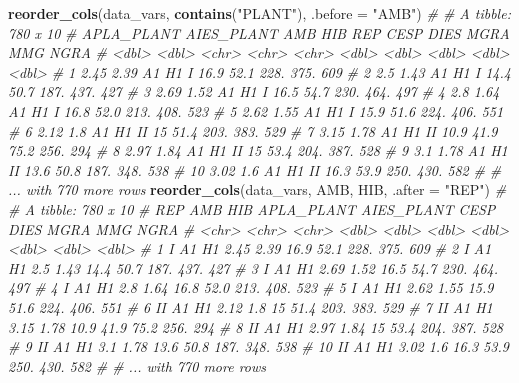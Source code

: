 \documentclass[
]{book}
\newenvironment{Shaded}{\begin{snugshade}}{\end{snugshade}}
\newcommand{\CommentTok}[1]{\textcolor[rgb]{0.56,0.35,0.01}{\textit{#1}}}
\newcommand{\DataTypeTok}[1]{\textcolor[rgb]{0.13,0.29,0.53}{#1}}
\newcommand{\KeywordTok}[1]{\textcolor[rgb]{0.13,0.29,0.53}{\textbf{#1}}}
\newcommand{\NormalTok}[1]{#1}
\newcommand{\StringTok}[1]{\textcolor[rgb]{0.31,0.60,0.02}{#1}}
\numberwithin{equation}{section}
\begin{document}
\begin{Shaded}
\begin{Highlighting}[]
\KeywordTok{reorder\_cols}\NormalTok{(data\_vars, }\KeywordTok{contains}\NormalTok{(}\StringTok{"PLANT"}\NormalTok{), }\DataTypeTok{.before =} \StringTok{"AMB"}\NormalTok{)}
\CommentTok{\# \# A tibble: 780 x 10}
\CommentTok{\#    APLA\_PLANT AIES\_PLANT AMB   HIB   REP    CESP  DIES  MGRA   MMG  NGRA}
\CommentTok{\#         \textless{}dbl\textgreater{}      \textless{}dbl\textgreater{} \textless{}chr\textgreater{} \textless{}chr\textgreater{} \textless{}chr\textgreater{} \textless{}dbl\textgreater{} \textless{}dbl\textgreater{} \textless{}dbl\textgreater{} \textless{}dbl\textgreater{} \textless{}dbl\textgreater{}}
\CommentTok{\#  1       2.45       2.39 A1    H1    I      16.9  52.1 228.   375.   609}
\CommentTok{\#  2       2.5        1.43 A1    H1    I      14.4  50.7 187.   437.   427}
\CommentTok{\#  3       2.69       1.52 A1    H1    I      16.5  54.7 230.   464.   497}
\CommentTok{\#  4       2.8        1.64 A1    H1    I      16.8  52.0 213.   408.   523}
\CommentTok{\#  5       2.62       1.55 A1    H1    I      15.9  51.6 224.   406.   551}
\CommentTok{\#  6       2.12       1.8  A1    H1    II     15    51.4 203.   383.   529}
\CommentTok{\#  7       3.15       1.78 A1    H1    II     10.9  41.9  75.2  256.   294}
\CommentTok{\#  8       2.97       1.84 A1    H1    II     15    53.4 204.   387.   528}
\CommentTok{\#  9       3.1        1.78 A1    H1    II     13.6  50.8 187.   348.   538}
\CommentTok{\# 10       3.02       1.6  A1    H1    II     16.3  53.9 250.   430.   582}
\CommentTok{\# \# ... with 770 more rows}
\KeywordTok{reorder\_cols}\NormalTok{(data\_vars, AMB, HIB, }\DataTypeTok{.after =} \StringTok{"REP"}\NormalTok{)}
\CommentTok{\# \# A tibble: 780 x 10}
\CommentTok{\#    REP   AMB   HIB   APLA\_PLANT AIES\_PLANT  CESP  DIES  MGRA   MMG  NGRA}
\CommentTok{\#    \textless{}chr\textgreater{} \textless{}chr\textgreater{} \textless{}chr\textgreater{}      \textless{}dbl\textgreater{}      \textless{}dbl\textgreater{} \textless{}dbl\textgreater{} \textless{}dbl\textgreater{} \textless{}dbl\textgreater{} \textless{}dbl\textgreater{} \textless{}dbl\textgreater{}}
\CommentTok{\#  1 I     A1    H1          2.45       2.39  16.9  52.1 228.   375.   609}
\CommentTok{\#  2 I     A1    H1          2.5        1.43  14.4  50.7 187.   437.   427}
\CommentTok{\#  3 I     A1    H1          2.69       1.52  16.5  54.7 230.   464.   497}
\CommentTok{\#  4 I     A1    H1          2.8        1.64  16.8  52.0 213.   408.   523}
\CommentTok{\#  5 I     A1    H1          2.62       1.55  15.9  51.6 224.   406.   551}
\CommentTok{\#  6 II    A1    H1          2.12       1.8   15    51.4 203.   383.   529}
\CommentTok{\#  7 II    A1    H1          3.15       1.78  10.9  41.9  75.2  256.   294}
\CommentTok{\#  8 II    A1    H1          2.97       1.84  15    53.4 204.   387.   528}
\CommentTok{\#  9 II    A1    H1          3.1        1.78  13.6  50.8 187.   348.   538}
\CommentTok{\# 10 II    A1    H1          3.02       1.6   16.3  53.9 250.   430.   582}
\CommentTok{\# \# ... with 770 more rows}
\end{Highlighting}
\end{Shaded}
\end{document}
